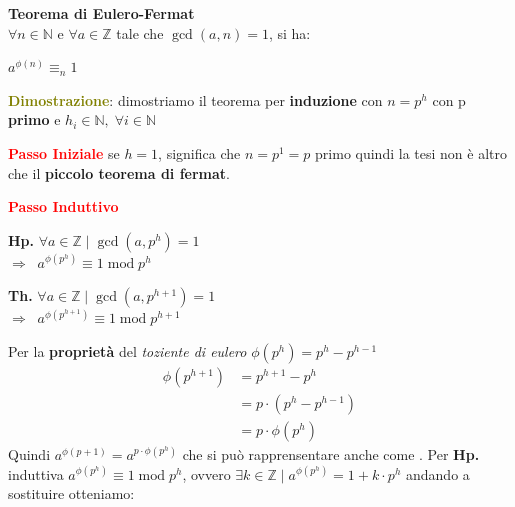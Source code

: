 \newpage
\begin{flushleft}
    \textbf{Teorema di Eulero-Fermat} \\
    $\forall n \in \mathbb{N}$ e $\forall a \in \mathbb{Z}$ tale che $\gcd (a, n) = 1$, si ha:
    
    {\centering
        $a^{\phi(n)} \equiv_n 1$
    \par}

    \begin{boxA}
        \textcolor{olive}{\textbf{Dimostrazione}}: dimostriamo il teorema per \textbf{induzione} con $n = p^h$ con p \textbf{primo} e $h_i \in \mathbb{N}, \; \forall i \in \mathbb{N}$

        \textcolor{red}{\textbf{Passo Iniziale}} \newline
        se $h = 1$, significa che $n = p^1 = p$ primo quindi la tesi non è altro che il \textbf{piccolo teorema di fermat}.

        \textcolor{red}{\textbf{Passo Induttivo}}
        
        {\centering
            \begin{minipage}[t]{0.45\textwidth}
                \textbf{Hp.} $\forall a \in \mathbb{Z} \; | \; \gcd (a, p^h) = 1$ \\
                $\Longrightarrow \;\; a^{\phi(p^h)} \equiv 1 \; \text{mod} \; p^h$
            \end{minipage}
            \hfill
            \begin{minipage}[t]{0.45\textwidth}
                \textbf{Th.} $\forall a \in \mathbb{Z} \; | \; \gcd (a, p^{h + 1}) = 1$ \\
                $\Longrightarrow \;\; a^{\phi(p^{h + 1})} \equiv 1 \; \text{mod} \; p^{h + 1}$
            \end{minipage}
        \par}
        Per la \textbf{proprietà} del \textit{toziente di eulero} $\phi(p^h) = p^h - p^{h - 1}$
        \begin{align*}
            \phi(p^{h + 1}) &= p^{h + 1} - p^h \\
            &= p \cdot (p^h - p^{h - 1}) \\
            &= p \cdot \phi(p^h)
        \end{align*}
        Quindi $a^{\phi(p + 1)} = a^{p \cdot \phi(p^h)}$ che si può rapprensentare anche come . Per \textbf{Hp.} induttiva $a^{\phi(p^h)} \equiv 1 \; \text{mod} \; p^h$, ovvero $\exists k \in \mathbb{Z} \; | \; a^{\phi(p^h)} = 1 + k \cdot p^h$ andando a sostituire otteniamo:


\end{boxA}
\end{flushleft}
